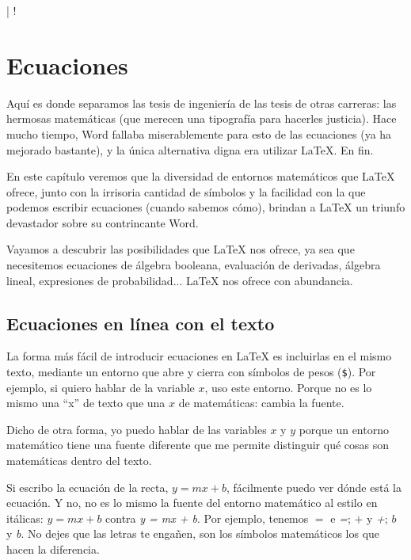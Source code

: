 \lstDeleteShortInline|
\lstMakeShortInline[style=latexi]!

\chapter{Ecuaciones}
\label{cha:ecuaciones}



Aquí es donde separamos las tesis de ingeniería de las tesis de otras carreras: las hermosas matemáticas (que merecen una tipografía para hacerles justicia). Hace mucho tiempo, Word fallaba miserablemente para esto de las ecuaciones (ya ha mejorado bastante), y la única alternativa digna era utilizar \LaTeX{}. En fin.

En este capítulo veremos que la diversidad de entornos matemáticos que \LaTeX{} ofrece, junto con la irrisoria cantidad de símbolos y la facilidad con la que podemos escribir ecuaciones (cuando sabemos cómo), brindan a \LaTeX{} un triunfo devastador sobre su contrincante Word.

Vayamos a descubrir las posibilidades que \LaTeX{} nos ofrece, ya sea que necesitemos ecuaciones de álgebra booleana, evaluación de derivadas, álgebra lineal, expresiones de probabilidad... \LaTeX{} nos ofrece con abundancia.



\section{Ecuaciones en línea con el texto}
\label{sec:ecuaciones_en_linea}



La forma más fácil de introducir ecuaciones en \LaTeX{} es incluirlas en el mismo texto, mediante un entorno que abre y cierra con símbolos de pesos (\texttt{\$}). Por ejemplo, si quiero hablar de la variable $x$, uso este entorno. Porque no es lo mismo una ``x'' de texto que una $x$ de matemáticas: cambia la fuente.

Dicho de otra forma, yo puedo hablar de las variables $x$ y $y$ porque un entorno matemático tiene una fuente diferente que me permite distinguir qué cosas son matemáticas dentro del texto.

Si escribo la ecuación de la recta, $y = mx + b$, fácilmente puedo ver dónde está la ecuación. Y no, no es lo mismo la fuente del entorno matemático al estilo en itálicas: $y = mx + b$ contra \emph{y = mx + b}. Por ejemplo, tenemos $=$ e \emph{=}; $+$ y \emph{+}; $b$ y \emph{b}. No dejes que las letras te engañen, son los símbolos matemáticos los que hacen la diferencia.


